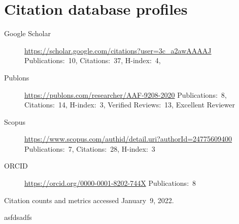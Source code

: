 \documentclass[a4paper, 11pt, oneside]{memoir}
\begin{document}
\section{Citation database profiles}
\begin{description}
\item[Google Scholar] 
  \url{https://scholar.google.com/citations?user=3c_a2awAAAAJ}\newline
  Publications:~10, Citations:~37, H-index:~4,
\item[Publons]
  \url{https://publons.com/researcher/AAF-9208-2020}\newline
  Publications:~8, Citations:~14, H-index:~3, Verified Reviews:~13, 
  Excellent Reviewer
\item[Scopus]
  \url{https://www.scopus.com/authid/detail.uri?authorId=24775609400}\newline
  Publications:~7, Citations:~28, H-index:~3
\item[ORCID]
  \url{https://orcid.org/0000-0001-8202-744X}\newline
  Publications:~8
\end{description}

\noindent
Citation counts and metrics accessed January~9, 2022.

\clearpage
asfdsadfs
\end{document}
